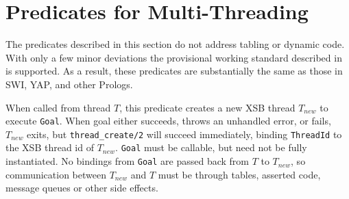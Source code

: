 \section{Predicates for Multi-Threading} \label{sec:mt-threading}

The predicates described in this section do not address tabling or
dynamic code.  With only a few minor deviations the provisional
working standard described in \cite{Prolog-MT-ISO} is supported.  As a
result, these predicates are substantially the same as those in SWI,
YAP, and other Prologs.

\begin{description}

%
When called from thread $T$, this predicate creates a new XSB thread
$T_{new}$ to execute {\tt Goal}.  When goal either succeeds, throws an
unhandled error, or fails, $T_{new}$ exits, but {\tt thread\_create/2}
will succeed immediately, binding {\tt ThreadId} to the XSB thread id
of $T_{new}$.  {\tt Goal} must be callable, but need not be fully
instantiated.  No bindings from {\tt Goal} are passed back from $T$ to
$T_{new}$, so communication between $T_{new}$ and $T$ must be through
tables, asserted code, message queues or other side effects.


\end{description}

